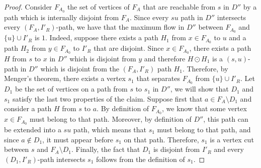 \documentclass[utf8,11pt]{article}
\theoremstyle{plain}
\theoremstyle{definition}
\begin{document}
\begin{proof}
    Consider $F_{A_0}$ the set of vertices of $F_A$ that are reachable from $s$ in $D''$ by a path which is internally disjoint from $F_A$. Since every $su$ path in $D''$ intersects every $(F_A,I'_R)$-path, we have that the maximum flow in $D''$ between $F_{A_0}$ and $\{u\} \cup I'_R$ is $1$. Indeed, suppose there exists a path $H_1$ from $x \in F_{A_0}$ to $u$ and a path $H_2$ from $y \in F_{A_0}$ to $I'_R$ that are disjoint. Since $x \in F_{A_0}$, there exists a path $H$ from $s$ to $x$ in $D''$ which is  disjoint from $y$ and therefore $H \odot H_1$ is a $(s,u)$-path in $D''$ which is disjoint from the $(F_A,I'_R)$ path $H_1$. Therefore, by Menger's theorem, there exists a vertex $s_1$ that separates $F_{A_0}$ from $\{u\} \cup I'_R$. Let $D_1$ be the set of vertices on a path from $s$ to $s_1$ in $D''$, we will show that $D_1$ and $s_1$ satisfy the last two properties of the claim. Suppose first that $a \in F_A \setminus D_1$ and consider a path $H$ from $s$ to $a$. By definition of $F_{A_0}$, we know that some vertex $x \in F_{A_0}$ must belong to that path. Moreover, by definition of $D''$, this path can be extended into a $su$ path, which means that $s_1$ must belong to that path, and since $a \not \in D_1$, it must appear before $s_1$ on that path. Therefore, $s_1$ is a vertex cut between $s$ and $F_A \setminus D_1$. Finally, the fact that $D_1$ is disjoint from $I'_R$ and every $(D_1,I'_R)$-path intersects $s_1$ follows from the definition of $s_1$.



\end{proof}
\end{document}
